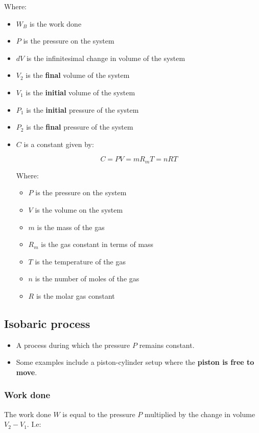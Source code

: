\documentclass[11pt]{article}
\begin{document}
Where:
\begin{itemize}
\item \(W_B\) is the work done
\item \(P\) is the pressure on the system
\item \(dV\) is the infinitesimal change in volume of the system
\item \(V_2\) is the \textbf{final} volume of the system
\item \(V_1\) is the \textbf{initial} volume of the system
\item \(P_1\) is the \textbf{initial} pressure of the system
\item \(P_2\) is the \textbf{final} pressure of the system
\item \(C\) is a constant given by:

\[C = PV = m R_m T = nRT\]

Where:
\begin{itemize}
\item \(P\) is the pressure on the system
\item \(V\) is the volume on the system
\item \(m\) is the mass of the gas
\item \(R_m\) is the gas constant in terms of mass
\item \(T\) is the temperature of the gas
\item \(n\) is the number of moles of the gas
\item \(R\) is the molar gas constant
\end{itemize}
\end{itemize}

\subsection{Isobaric process}
\label{sec:orgfeb3fcc}
\begin{itemize}
\item A process during which the pressure \(P\) remains constant.
\item Some examples include a piston-cylinder setup where the \textbf{piston is free to move}.
\end{itemize}

\subsubsection{Work done}
\label{sec:orge10bb23}
The work done \(W\) is equal to the pressure \(P\) multiplied by the change in volume \(V_2 - V_1\). I.e:
\end{document}
